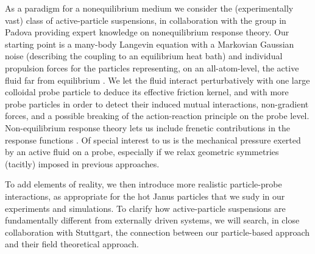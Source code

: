 \begin{workpackage}[id=WPactive,wphases=0-48,
  short=Active Particle Suspensions,%
  title=Probing Active Particle Suspensions with Colloids and Polymers,
  lead=ULEI,
  ULEIRM=96,UNIPDRM=6,USTUTTRM=2]
\begin{tasklist}
\begin{task}[title=Non-Equilibrium Equations of State (NEOS),id=task1,PM=8,lead=ULEI,partners={UNIPD,USTUTT},
wphases=0-48!0.5]
As a paradigm for a nonequilibrium medium we consider the (experimentally vast) class of
active-particle suspensions, in collaboration with the group in Padova providing expert knowledge on 
nonequilibrium response theory.
%
Our starting point is a many-body Langevin equation with a Markovian Gaussian noise
(describing the coupling to an equilibrium heat bath) and individual propulsion forces for
the particles representing, on an all-atom-level, the active fluid far from equilibrium \cite{solon-etal:2015}. 
%
We let the fluid interact perturbatively with one large colloidal probe particle to
deduce its effective friction kernel, and with more probe particles in order to
detect their induced mutual interactions, non-gradient forces, and a possible breaking of
the action-reaction principle on the probe level.  
%
Non-equilibrium response theory lets us include frenetic contributions in the response 
functions \cite{baiesi-wynants:2009}.
%
Of special interest to us is the mechanical pressure exerted by an active fluid on a probe, 
especially if we relax geometric symmetries (tacitly) imposed in previous approaches.

To add elements of reality, we then introduce more realistic particle-probe interactions, as appropriate for the hot 
Janus particles that we sudy in our experiments and simulations.
%
To clarify how active-particle suspensions are fundamentally different from externally driven systems, 
we will search, in close collaboration with Stuttgart, the connection between our particle-based approach 
and their field theoretical approach.

\end{task}


\end{tasklist}
\end{workpackage}
